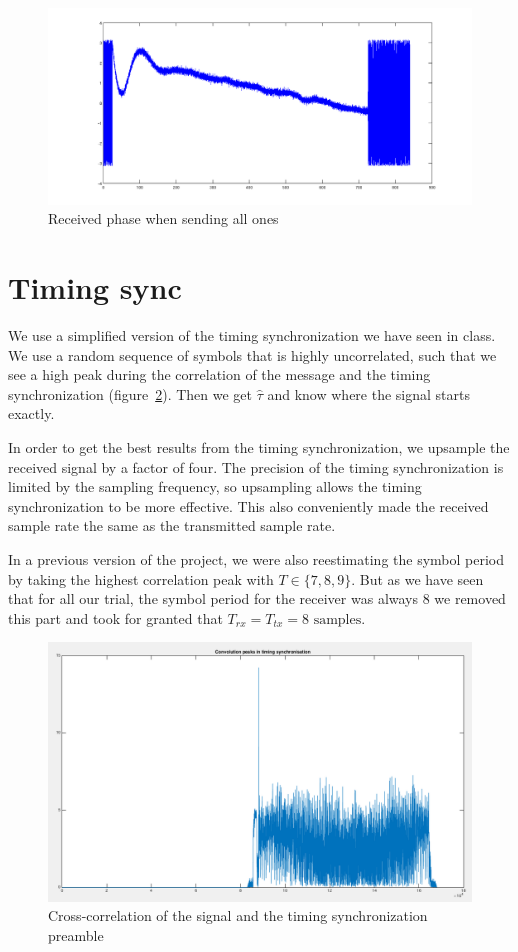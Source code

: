 \documentclass{article}
\begin{document}
\begin{figure}
  \centering\includegraphics[width=\textwidth]{../presentation/phase.png}
  \caption{Received phase when sending all ones}
  \label{fig:phase}
\end{figure}

\section{Timing sync}

We use a simplified version of the timing synchronization we have seen in class. We use a random sequence of symbols that is highly uncorrelated, such that we see a high peak during the correlation of the message and the timing synchronization (figure~\ref{fig:timing}). Then we get $\hat\tau$ and know where the signal starts exactly.

In order to get the best results from the timing synchronization, we upsample
the received signal by a factor of four. The precision of the timing
synchronization is limited by the sampling frequency, so upsampling allows the
timing synchronization to be more effective. This also conveniently made the
received sample rate the same as the transmitted sample rate.

In a previous version of the project, we were also reestimating the symbol period by taking the highest correlation peak with $T\in\{7,8,9\}$. But as we have seen that for all our trial, the symbol period for the receiver was always 8 we removed this part and took for granted that \(T_{rx} = T_{tx} = 8\text{ samples}\).

\begin{figure}
  \centering\includegraphics[width=\textwidth]{../presentation/timing.png}
  \caption{Cross-correlation of the signal and the timing synchronization preamble}
  \label{fig:timing}
\end{figure}
\end{document}
